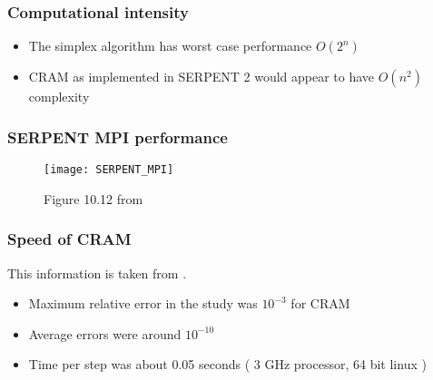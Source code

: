 \documentclass{beamer}
\begin{document}
\begin{frame}
\frametitle{Computational intensity}

    \begin{itemize}
        \item The simplex algorithm has worst case performance $O(2^{n})$ \cite{klee_how_1969}
        \item CRAM as implemented in SERPENT 2 would appear to have $ O(n^{2})$ complexity
    \end{itemize}

\end{frame}

\begin{frame}
\frametitle{SERPENT MPI performance} 

    \begin{figure}
        \centering
        \texttt{[image: SERPENT\_MPI]}
        \caption{Figure 10.12 from \cite{jaakko_leppanen_development_2007}}
        \label{fig:serpent_mpi}
    \end{figure}

\end{frame}

\begin{frame}
\frametitle{Speed of CRAM}

This information is taken from \cite{isotalo_comparison_2011}.

    \begin{itemize}
        \item Maximum relative error in the study was $10^{-3}$ for CRAM
        \item Average errors were around $10^{-10}$
        \item Time per step was about 0.05 seconds ( 3 GHz processor, 64 bit linux )
    \end{itemize}

\end{frame}
\end{document}
